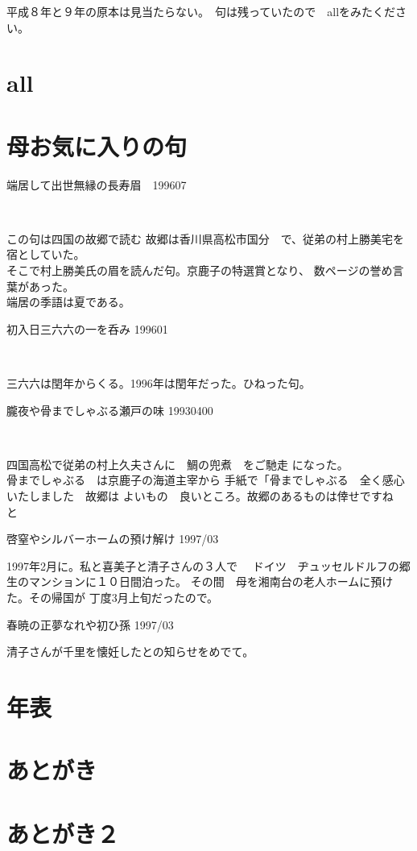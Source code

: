 \documentclass[b5paper]{tbook}
\begin{document}

\vspace{0.6cm}

平成８年と９年の原本は見当たらない。　句は残っていたので　allをみたください。

\chapter{all}

\chapter{母お気に入りの句}%
\begin{shiika}端居して出世無縁の長寿眉　\hfill{199607}　\end{shiika}　　　

この句は四国の故郷で読む
故郷は香川県高松市国分　で、従弟の村上勝美宅を宿としていた。
\\そこで村上勝美氏の眉を読んだ句。京鹿子の特選賞となり、
数ページの誉め言葉があった。\\端居の季語は夏である。

\vspace{5mm}
\begin{shiika}初入日三六六の一を呑み 199601　\end{shiika}　

三六六は閏年からくる。1996年は閏年だった。ひねった句。
\vspace{5mm}
\begin{shiika}朧夜や骨までしゃぶる瀬戸の味 19930400\end{shiika}　

四国高松で従弟の村上久夫さんに　鯛の兜煮　をご馳走
になった。
\\骨までしゃぶる　は京鹿子の海道主宰から
手紙で「骨までしゃぶる　全く感心いたしました　故郷は
よいもの　良いところ。故郷のあるものは倖せですね　と
\vspace{5mm}
\begin{shiika}啓窒やシルバーホームの預け解け 1997/03\end{shiika}

1997年2月に。私と喜美子と清子さんの３人で　
ドイツ　ヂュッセルドルフの郷生のマンションに１０日間泊った。
その間　母を湘南台の老人ホームに預けた。その帰国が
丁度3月上旬だったので。
\vspace{5mm}

\begin{shiika}春暁の正夢なれや初ひ孫 1997/03\end{shiika}

清子さんが千里を懐妊したとの知らせをめでて。

\chapter{年表}



\chapter*{あとがき}


\chapter*{あとがき２}


\end{document}
